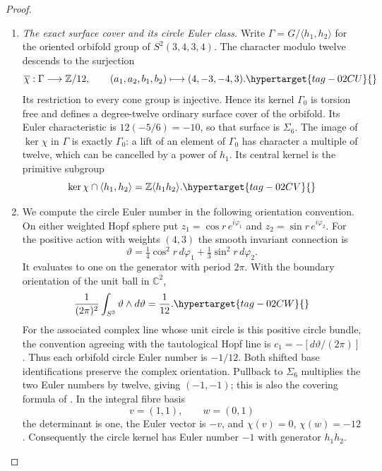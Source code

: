 \documentclass[11pt,a4paper]{article}
\numberwithin{equation}{section}
\theoremstyle{definition}
\begin{document}
\begin{proof}
\begin{enumerate}[label=\arabic*.,leftmargin=*]
\item \emph{The exact surface cover and its circle Euler class.}
Write $\Gamma=G/\langle h_1,h_2\rangle$ for the oriented
orbifold group of $S^2(3,4,3,4)$. The character modulo
twelve descends to the surjection
\begin{equation}
 \overline\chi:\Gamma\longrightarrow\mathbb Z/12,
       \qquad(a_1,a_2,b_1,b_2)\longmapsto(4,-3,-4,3).
 \hypertarget{tag-02CU}{}\label{maps:eq:E.S26}
\end{equation}
Its restriction to every cone group is injective. Hence its
kernel $\Gamma_0$ is torsion free and defines a degree-twelve
ordinary surface cover of the orbifold. Its Euler characteristic
is $12(-5/6)=-10$, so that surface is $\Sigma_6$. The image
of $\ker\chi$ in $\Gamma$ is exactly $\Gamma_0$: a lift of
an element of $\Gamma_0$ has character a multiple of twelve,
which can be cancelled by a power of $h_1$. Its central
kernel is the primitive subgroup
\begin{equation}
 \ker\chi\cap\langle h_1,h_2\rangle
                =\mathbb Z\langle h_1h_2\rangle.
 \hypertarget{tag-02CV}{}\label{maps:eq:E.S27}
\end{equation}

\item We compute the circle Euler number in the following orientation convention. On either weighted Hopf sphere put
$z_1=\cos r\,e^{i\varphi_1}$ and
$z_2=\sin r\,e^{i\varphi_2}$. For the positive action with
weights $(4,3)$ the smooth invariant connection is
\[
 \vartheta=\tfrac14\cos^2r\,d\varphi_1
                    +\tfrac13\sin^2r\,d\varphi_2.
\]
It evaluates to one on the generator with period $2\pi$.
With the boundary orientation of the unit ball in $\mathbb C^2$,
\begin{equation}
             \frac1{(2\pi)^2}\int_{S^3}\vartheta\wedge d\vartheta
                         =\frac1{12}.
 \hypertarget{tag-02CW}{}\label{maps:eq:E.S28}
\end{equation}
For the associated complex line whose unit circle is this
positive circle bundle, the convention agreeing with the
tautological Hopf line is $c_1=-[d\vartheta/(2\pi)]$.
Thus each orbifold circle Euler number is $-1/12$.
Both shifted base identifications preserve the complex
orientation. Pullback to $\Sigma_6$ multiplies the two Euler
numbers by twelve, giving $(-1,-1)$; this is also the
covering formula of \cite[Theorem~3.6, p.~436]{rootScott83}.
In the integral fibre basis
\[
                  v=(1,1),\qquad w=(0,1)
\]
the determinant is one, the Euler vector is $-v$, and
$\chi(v)=0$, $\chi(w)=-12$. Consequently the circle kernel
has Euler number $-1$ with generator $h_1h_2$.


\end{enumerate}
\end{proof}
\end{document}
